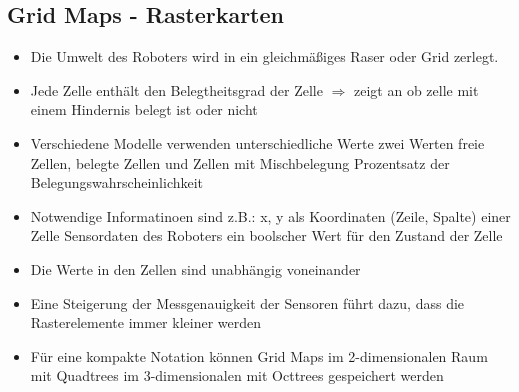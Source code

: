 \subsection{Grid Maps - Rasterkarten}
\begin{itemize}
	\item Die Umwelt des Roboters wird in ein gleichmäßiges Raser oder Grid zerlegt.
	\item Jede Zelle enthält den Belegtheitsgrad der Zelle $\Rightarrow$ zeigt an ob zelle mit einem Hindernis belegt ist oder nicht
	\item Verschiedene Modelle verwenden unterschiedliche Werte
	\subitem zwei Werten
	\subitem freie Zellen, belegte Zellen und Zellen mit Mischbelegung
	\subitem Prozentsatz der Belegungswahrscheinlichkeit
	\item Notwendige Informatinoen sind z.B.:
	\subitem x, y als Koordinaten (Zeile, Spalte) einer Zelle
	\subitem Sensordaten des Roboters
	\subitem ein boolscher Wert für den Zustand der Zelle
	\item Die Werte in den Zellen sind unabhängig voneinander
	\item Eine Steigerung der Messgenauigkeit der Sensoren führt dazu, dass die Rasterelemente immer kleiner werden
	\item Für eine kompakte Notation können Grid Maps im 2-dimensionalen Raum mit Quadtrees im 3-dimensionalen mit Octtrees gespeichert werden
\end{itemize}
